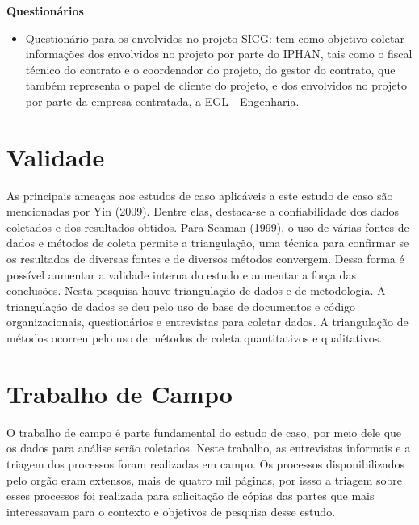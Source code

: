 \textbf{Questionários}
\begin{itemize}
\item Questionário para os envolvidos no projeto SICG: tem como objetivo coletar informações dos envolvidos no projeto por parte do IPHAN, tais como o fiscal técnico do contrato e o coordenador do projeto, do gestor do contrato, que também representa o papel de cliente do projeto, e dos envolvidos no projeto por parte da empresa contratada, a EGL - Engenharia.
\end{itemize}

\section[Validade]{Validade}

As principais ameaças aos estudos de caso aplicáveis a este estudo de caso
são mencionadas por Yin (2009). Dentre elas, destaca-se a confiabilidade dos dados
coletados e dos resultados obtidos. Para Seaman (1999), o uso de várias fontes de dados
e métodos de coleta permite a triangulação, uma técnica para confirmar se os resultados
de diversas fontes e de diversos métodos convergem. Dessa forma é possível aumentar a
validade interna do estudo e aumentar a força das conclusões. Nesta pesquisa houve
triangulação de dados  e de metodologia. A triangulação de dados se deu
pelo uso de base de documentos e código organizacionais, questionários e entrevistas para coletar dados. A triangulação
de métodos ocorreu pelo uso de métodos de coleta quantitativos e qualitativos.


\section[Trabalho de Campo]{Trabalho de Campo}

O trabalho de campo é parte fundamental do estudo de caso, por meio dele que os dados para análise serão coletados. Neste trabalho, as entrevistas informais e a triagem dos processos foram realizadas em campo. Os processos disponibilizados pelo orgão eram extensos, mais de quatro mil páginas, por issso a triagem sobre esses processos foi realizada para solicitação de cópias das partes que mais interessavam para o contexto e objetivos de pesquisa desse estudo.